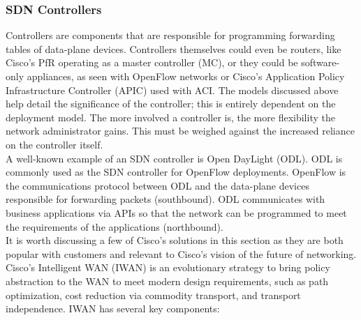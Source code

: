 \subsubsection{SDN Controllers}
Controllers are components that are responsible for programming forwarding
tables of data-plane devices. Controllers themselves could even be routers,
like Cisco’s PfR operating as a master controller (MC), or they could be
software-only appliances, as seen with OpenFlow networks or Cisco’s
Application Policy Infrastructure Controller (APIC) used with ACI\@. The models
discussed above help detail the significance of the controller; this is
entirely dependent on the deployment model. The more involved a controller is,
the more flexibility the network administrator gains. This must be weighed
against the increased reliance on the controller itself. \\

A well-known example of an SDN controller is Open DayLight (ODL). ODL is
commonly used as the SDN controller for OpenFlow deployments. OpenFlow is the
communications protocol between ODL and the data-plane devices responsible for
forwarding packets (southbound). ODL communicates with business applications
via APIs so that the network can be programmed to meet the requirements of the
applications (northbound). \\

It is worth discussing a few of Cisco’s solutions in this section as they are
both popular with customers and relevant to Cisco’s vision of the future of
networking. Cisco’s Intelligent WAN (IWAN) is an evolutionary strategy to
bring policy abstraction to the WAN to meet modern design requirements, such
as path optimization, cost reduction via commodity transport, and transport
independence. IWAN has several key components:

